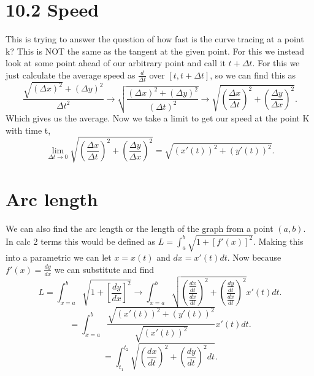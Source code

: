\section{10.2 Speed}%
\label{sec:10.2 Speed}
This is trying to answer the question of how fast is the curve tracing at a point k? This is NOT the same as the tangent at the given point. For this we instead look at some point ahead of our arbitrary point and call it $ t+\Delta t $. For this we just calculate the average speed as $ \frac{ d }{ \Delta t }  $ over $ \left[ t,t+\Delta t \right]  $, so we can find this as
\[
\frac{ \sqrt{ \left( \Delta x \right) ^2 } + \left( \Delta y \right) ^2 }{ \Delta t^2 } \to \sqrt{ \frac{ \left( \Delta x \right) ^2+\left( \Delta y \right) ^2 }{ \left( \Delta t \right) ^2 } } \to \sqrt{ \left( \frac{ \Delta x }{ \Delta t } \right) ^2 + \left( \frac{ \Delta y }{ \Delta x } \right) ^2 } 
.\] 
Which gives us the average. Now we take a limit to get our speed at the point K with time t,
\[
\lim_{ \Delta t \to 0} \sqrt{ \left( \frac{ \Delta x }{ \Delta t } \right) ^2 + \left( \frac{ \Delta y }{ \Delta x } \right) ^2 } = \sqrt{ \left( x'\left( t \right)  \right) ^2+\left( y'\left( t \right)  \right) ^2 } 
.\] 

\section{Arc length}%
\label{sec:Arc length}
We can also find the arc length or the length of the graph from a point $ \left( a,b \right)  $. In calc 2 terms this would be defined as $ L=\int_{ a }^{ b } \sqrt{ 1+\left[ f'\left( x \right)  \right] ^2 }  $. Making this into a parametric we can let $ x=x\left( t \right)  $ and $ dx=x'\left( t \right) dt $. Now because $ f'\left( x \right) =\frac{ dy }{ dx }  $ we can substitute and find
\[
L=\int_{ x=a }^{ b } \sqrt{ 1+\left[ \frac{ dy }{ dx }  \right] ^2 } \to \int_{ x=a }^{ b } \sqrt{ \left( \frac{ \frac{ dx }{ dt } }{ \frac{ dx }{ dt } } \right)^2 + \left( \frac{ \frac{ dy }{ dt }  }{ \frac{ dx }{ dt }  } \right) ^2 } x'\left( t \right) dt
.\] 
\[
=\int_{ x=a }^{ b } \frac{ \sqrt{ \left( x'\left( t \right)  \right) ^2+ \left( y'\left( t \right)  \right) ^2 }  }{ \sqrt{ \left( x'\left( t \right)  \right) ^2 } }x'\left( t \right) dt 
.\] 
\[
=\int_{ t_1 }^{ t_2 } \sqrt{ \left( \frac{ dx }{ dt }  \right) ^2+\left( \frac{ dy }{ dt }  \right)^2dt  } 
.\] 

